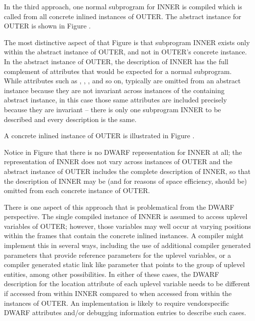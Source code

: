 In the third approach, one normal subprogram for INNER is
compiled which is called from all concrete inlined instances of
OUTER. The abstract instance for OUTER is shown in 
Figure .

The most distinctive aspect of that Figure is that subprogram
INNER exists only within the abstract instance of OUTER,
and not in OUTER\textquoteright s concrete instance. In the abstract
instance of OUTER, the description of INNER has the full
complement of attributes that would be expected for a
normal subprogram. 
While attributes such as 
,
, 
,
and so on, typically are omitted
from 
an 
abstract instance because they are not invariant across
instances of the containing abstract instance, in this case
those same attributes are included precisely because they are
invariant -- there is only one subprogram INNER to be described
and every description is the same.

A concrete inlined instance of OUTER is illustrated in
Figure .

Notice in 
Figure 
that there is no DWARF representation for
INNER at all; the representation of INNER does not vary across
instances of OUTER and the abstract instance of OUTER includes
the complete description of INNER, so that the description of
INNER may be (and for reasons of space efficiency, should be)
omitted from each 
concrete instance of OUTER.

There is one aspect of this approach that is problematical from
the DWARF perspective. The single compiled instance of INNER
is assumed to access up\dash level variables of OUTER; however,
those variables may well occur at varying positions within
the frames that contain the 
concrete inlined instances. A
compiler might implement this in several ways, including the
use of additional compiler generated parameters that provide
reference parameters for the up\dash level variables, or a compiler
generated static link like parameter that points to the group
of up\dash level entities, among other possibilities. In either of
these cases, the DWARF description for the location attribute
of each uplevel variable needs to be different if accessed
from within INNER compared to when accessed from within the
instances of OUTER. An implementation is likely to require
vendor\dash specific DWARF attributes and/or debugging information
entries to describe such cases.

